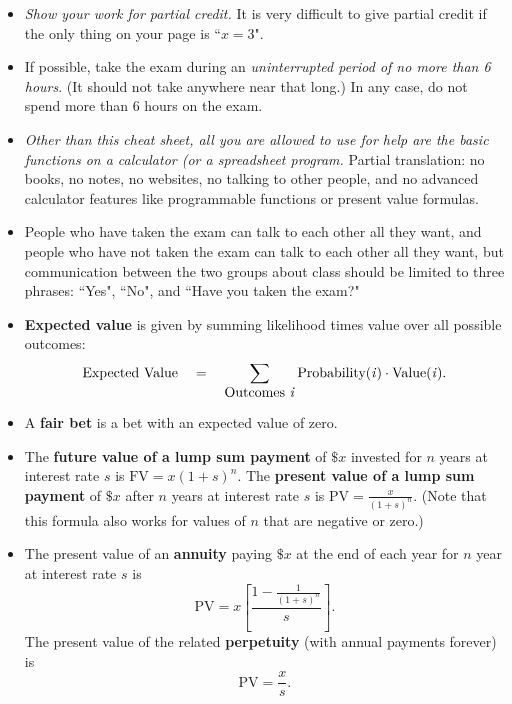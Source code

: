 \documentclass{article}
\begin{document}
\begin{EXAM}

\begin{itemize}

\item \emph{Show your work for partial credit.} It is very difficult to give partial credit if the only thing on your
page is ``$x=3$".


\item If possible, take the exam during an \emph{uninterrupted period of no more than 6 hours}. (It should not take anywhere near that long.) In any case, do not spend more than 6 hours on the exam.

\item \emph{Other than this cheat sheet, all you are allowed to use for help are the basic functions on a calculator (or a spreadsheet program.}
Partial translation: no books, no notes, no websites, no talking to other people, and no advanced calculator features
like programmable functions or present value formulas.

\item People who have taken the exam can talk to each other all they want, and people who have not taken the exam can
talk to each other all they want, but communication between the two groups about class should be limited to three
phrases: ``Yes", ``No", and ``Have you taken the exam?"

\item \textbf{Expected value} is given by summing likelihood times value over all possible outcomes:
\[
\mbox{Expected Value}\ \ \  = \ \ \ \sum_{\mbox{Outcomes \emph{i}}} \mbox{Probability(\emph{i})} \cdot \mbox{Value(\emph{i})}.
\]


\item A \textbf{fair bet} is a bet with an expected value of zero.

\item The \textbf{future value of a lump sum payment} of $\$x$ invested for $n$ years at interest rate $s$ is $\displaystyle \mbox{FV} = x(1+s)^{n}$. The \textbf{present value of a lump sum payment} of $\$x$ after $n$ years at interest rate $s$ is $\displaystyle \mbox{PV} = \frac{x}{(1+s)^{n}}.$ (Note that this formula also works for values of $n$ that are negative or zero.)

\item The present value of an \textbf{annuity} paying $\$x$ at the end of each year for $n$ year at interest rate $s$ is
\[
\mbox{PV}=x\left[ \frac{1 - \displaystyle\frac{1}{(1+s)^n}}{s}\right].
\]
The present value of the related \textbf{perpetuity} (with annual payments forever) is
\[
\mbox{PV}=\frac{x}{s}.
\]


\end{itemize}
\end{EXAM}
\end{document}
